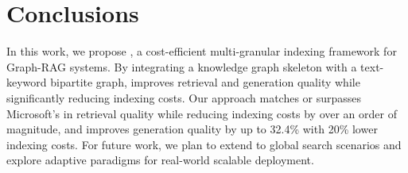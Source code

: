 \section{Conclusions}
In this work, we propose \sketrag, a cost-efficient multi-granular indexing framework for Graph-RAG systems. By integrating a knowledge graph skeleton with a text-keyword bipartite graph, \sketrag improves retrieval and generation quality while significantly reducing indexing costs. Our approach matches or surpasses Microsoft's \graphrag in retrieval quality while reducing indexing costs by over an order of magnitude, and improves generation quality by up to 32.4\% with 20\% lower indexing costs.
For future work, we plan to extend \sketrag to global search scenarios and explore adaptive paradigms for real-world scalable deployment.